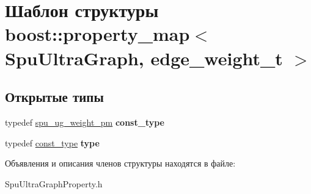 \hypertarget{structboost_1_1property__map_3_01_spu_ultra_graph_00_01edge__weight__t_01_4}{}\section{Шаблон структуры boost\+:\+:property\+\_\+map$<$ Spu\+Ultra\+Graph, edge\+\_\+weight\+\_\+t $>$}
\label{structboost_1_1property__map_3_01_spu_ultra_graph_00_01edge__weight__t_01_4}
\subsection*{Открытые типы}
\begin{DoxyCompactItemize}
\item 
\mbox{\label{structboost_1_1property__map_3_01_spu_ultra_graph_00_01edge__weight__t_01_4_a202cfea1a28d0fdaa36d1acc9acea72b}} 
typedef \hyperlink{classboost_1_1spu__ug__readable__property__map}{spu\+\_\+ug\+\_\+weight\+\_\+pm} {\bfseries const\+\_\+type}
\item 
\mbox{\label{structboost_1_1property__map_3_01_spu_ultra_graph_00_01edge__weight__t_01_4_a30ff842801eadeb5e6a19a26efe22237}} 
typedef \hyperlink{classboost_1_1spu__ug__readable__property__map}{const\+\_\+type} {\bfseries type}
\end{DoxyCompactItemize}


Объявления и описания членов структуры находятся в файле\+:\begin{DoxyCompactItemize}
\item 
Spu\+Ultra\+Graph\+Property.\+h\end{DoxyCompactItemize}
